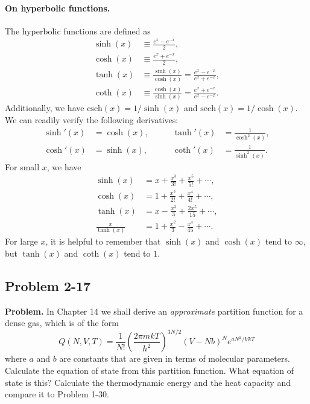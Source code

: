 \documentclass[twocolumn, 10pt]{article}
\numberwithin{equation}{section}
\newenvironment{problem}
{\par\medskip \color{problue}
  \textbf{Problem. }\ignorespaces}
{\medskip}
\begin{document}
\paragraph*{On hyperbolic functions.}

The hyperbolic functions are defined as
%
\begin{align*}
  \sinh(x) &\equiv \frac{ e^x - e^{-x} } { 2 }, \\
  \cosh(x) &\equiv \frac{ e^x + e^{-x} } { 2 }, \\
  \tanh(x) &\equiv \frac{ \sinh(x) } { \cosh(x)}  = \frac{ e^x - e^{-x} } { e^x + e^{-x} }, \\
  \coth(x) &\equiv \frac{ \cosh(x) } { \sinh(x) }  = \frac{ e^x + e^{-x} } { e^x - e^{-x} }.
\end{align*}
Additionally, we have
$\mathrm{csch}(x) = 1/\sinh(x)$ and
$\mathrm{sech}(x) = 1/\cosh(x)$.
%
We can readily verify the following derivatives:
\begin{align*}
  \sinh'(x) &= \cosh(x), &\qquad
  \tanh'(x) &= \frac{ 1 } { \cosh^2(x) }, \\
  \cosh'(x) &= \sinh(x), &\qquad
  \coth'(x) &= \frac{ 1 } { \sinh^2(x) }.
\end{align*}
%
For small $x$, we have
\begin{align*}
  \sinh(x) &= x + \frac{x^3}{3!} + \frac{x^5}{5!} + \cdots, \\
  \cosh(x) &= 1 + \frac{x^2}{2!} + \frac{x^4}{4!} + \cdots, \\
  \tanh(x) &= x - \frac{x^3}{3} + \frac{2x^5}{15} + \cdots, \\
  \frac{x}{\tanh(x)} &= 1 + \frac{x^2}{3} - \frac{x^4}{45} + \cdots.
\end{align*}
For large $x$, it is helpful to remember that
$\sinh(x)$ and $\cosh(x)$ tend to $\infty$,
but $\tanh(x)$ and $\coth(x)$ tend to $1$.


\subsection{Problem 2-17}

\begin{problem}
In Chapter 14 we shall derive an \emph{approximate}
partition function for a dense gas,
which is of the form
$$
  Q(N, V, T)
  =
  \frac{1}{N!}
  \left( \frac{ 2\pi m k T }{ h^2 } \right)^{3N/2}
  (V - N b)^N e^{a N^2/V k T}
$$
where $a$ and $b$ are constants that are given
in terms of molecular parameters.
%
Calculate the equation of state from this partition function.
%
What equation of state is this?
%
Calculate the thermodynamic energy and the heat capacity
and compare it to Problem 1-30.
\end{problem}
\end{document}
